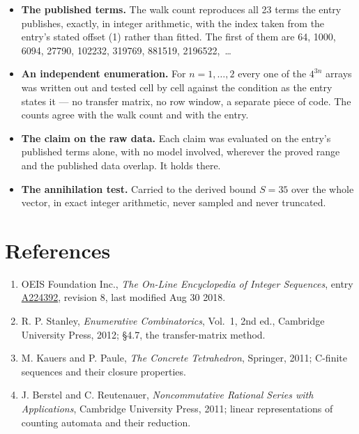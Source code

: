 \documentclass[11pt]{article}
\theoremstyle{definition}
\begin{document}
\begin{itemize}

\item {\bfseries The published terms.} The walk count reproduces all 23 terms the entry publishes, exactly, in integer arithmetic, with the index taken from the entry's stated offset (1) rather than fitted. The first of them are 64, 1000, 6094, 27790, 102232, 319769, 881519, 2196522,~\dots

\item {\bfseries An independent enumeration.} For $n = 1,\dots,2$ every one of the $4^{3n}$ arrays was written out and tested cell by cell against the condition as the entry states it --- no transfer matrix, no row window, a separate piece of code. The counts agree with the walk count and with the entry.

\item {\bfseries The claim on the raw data.} Each claim was evaluated on the entry's published terms alone, with no model involved, wherever the proved range and the published data overlap. It holds there.

\item {\bfseries The annihilation test.} Carried to the derived bound $S = 35$ over the whole vector, in exact integer arithmetic, never sampled and never truncated.

\end{itemize}

\section{References}

\begin{enumerate}

\item OEIS Foundation Inc., \emph{The On-Line Encyclopedia of Integer Sequences}, entry \href{https://oeis.org/A224392}{A224392}, revision 8, last modified Aug 30 2018.

\item R. P. Stanley, \emph{Enumerative Combinatorics}, Vol.~1, 2nd ed., Cambridge University Press, 2012; \S4.7, the transfer-matrix method.

\item M. Kauers and P. Paule, \emph{The Concrete Tetrahedron}, Springer, 2011; C-finite sequences and their closure properties.

\item J. Berstel and C. Reutenauer, \emph{Noncommutative Rational Series with Applications}, Cambridge University Press, 2011; linear representations of counting automata and their reduction.

\end{enumerate}
\end{document}
